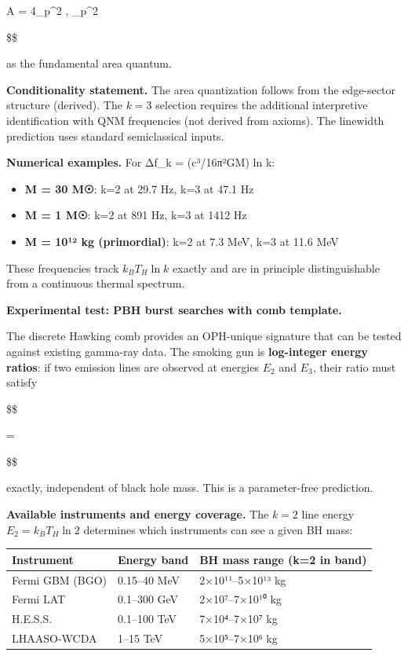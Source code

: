 \documentclass[11pt,a4paper]{article}
\theoremstyle{remark}
\providecommand{\tightlist}{%
  \setlength{\itemsep}{0pt}\setlength{\parskip}{0pt}}
\begin{document}
\Delta A = 4\ell\_p\^{}2   , \ell\_p\^{}2

\$\$

as the fundamental area quantum.

\textbf{Conditionality statement.} The area quantization follows from the
edge-sector structure (derived). The \(k = 3\) selection requires the
additional interpretive identification with QNM frequencies (not derived
from axioms). The linewidth prediction uses standard semiclassical inputs.

\textbf{Numerical examples.} For Δf\_k = (c³/16π²GM) ln k:

\begin{itemize}
\tightlist
\item
  \textbf{M = 30 M☉}: k=2 at 29.7 Hz, k=3 at 47.1 Hz
\item
  \textbf{M = 1 M☉}: k=2 at 891 Hz, k=3 at 1412 Hz
\item
  \textbf{M = 10¹² kg (primordial)}: k=2 at 7.3 MeV, k=3 at 11.6 MeV
\end{itemize}

These frequencies track \(k_B T_H \ln k\) exactly and are in principle
distinguishable from a continuous thermal spectrum.

\textbf{Experimental test: PBH burst searches with comb template.}

The discrete Hawking comb provides an OPH-unique signature that can be tested
against existing gamma-ray data. The smoking gun is \textbf{log-integer energy
ratios}: if two emission lines are observed at energies \(E_2\) and \(E_3\),
their ratio must satisfy

\$\$

 =  

\$\$

exactly, independent of black hole mass. This is a parameter-free prediction.

\textbf{Available instruments and energy coverage.} The \(k = 2\) line energy
\(E_2 = k_B T_H \ln 2\) determines which instruments can see a given BH mass:

{\def\LTcaptype{none} %
\begin{longtable}[]{@{}lll@{}}
\toprule\noalign{}
Instrument & Energy band & BH mass range (k=2 in band) \\
\midrule\noalign{}
\endhead
\bottomrule\noalign{}
\endlastfoot
Fermi GBM (BGO) & 0.15--40 MeV & 2×10¹¹--5×10¹³ kg \\
Fermi LAT & 0.1--300 GeV & 2×10⁷--7×10¹⁰ kg \\
H.E.S.S. & 0.1--100 TeV & 7×10⁴--7×10⁷ kg \\
LHAASO-WCDA & 1--15 TeV & 5×10⁵--7×10⁶ kg \\
\end{longtable}
}
\end{document}
